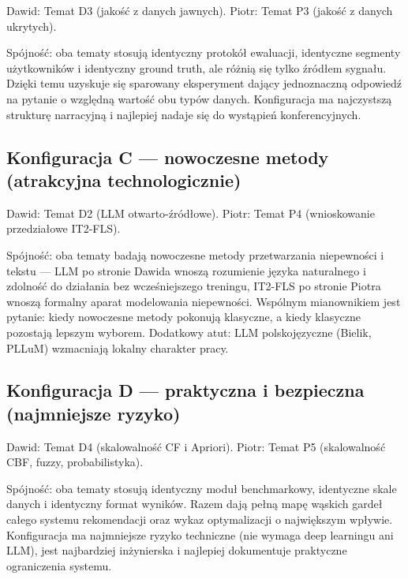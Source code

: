 \documentclass[12pt,a4paper]{article}
\begin{document}
Dawid: Temat D3 (jakość z danych jawnych). Piotr: Temat P3 (jakość z danych ukrytych).

Spójność: oba tematy stosują identyczny protokół ewaluacji, identyczne segmenty użytkowników i identyczny ground truth, ale różnią się tylko źródłem sygnału. Dzięki temu uzyskuje się sparowany eksperyment dający jednoznaczną odpowiedź na pytanie o względną wartość obu typów danych. Konfiguracja ma najczystszą strukturę narracyjną i najlepiej nadaje się do wystąpień konferencyjnych.

\subsection*{Konfiguracja C --- nowoczesne metody (atrakcyjna technologicznie)}

Dawid: Temat D2 (LLM otwarto-źródłowe). Piotr: Temat P4 (wnioskowanie przedziałowe IT2-FLS).

Spójność: oba tematy badają nowoczesne metody przetwarzania niepewności i tekstu --- LLM po stronie Dawida wnoszą rozumienie języka naturalnego i zdolność do działania bez wcześniejszego treningu, IT2-FLS po stronie Piotra wnoszą formalny aparat modelowania niepewności. Wspólnym mianownikiem jest pytanie: kiedy nowoczesne metody pokonują klasyczne, a kiedy klasyczne pozostają lepszym wyborem. Dodatkowy atut: LLM polskojęzyczne (Bielik, PLLuM) wzmacniają lokalny charakter pracy.

\subsection*{Konfiguracja D --- praktyczna i bezpieczna (najmniejsze ryzyko)}

Dawid: Temat D4 (skalowalność CF i Apriori). Piotr: Temat P5 (skalowalność CBF, fuzzy, probabilistyka).

Spójność: oba tematy stosują identyczny moduł benchmarkowy, identyczne skale danych i identyczny format wyników. Razem dają pełną mapę wąskich gardeł całego systemu rekomendacji oraz wykaz optymalizacji o największym wpływie. Konfiguracja ma najmniejsze ryzyko techniczne (nie wymaga deep learningu ani LLM), jest najbardziej inżynierska i najlepiej dokumentuje praktyczne ograniczenia systemu.
\end{document}
